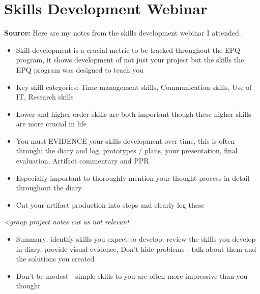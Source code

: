 \section{Skills Development Webinar}
\label{research:SkillsDevelopmentWebinar}

\textbf{Source:} 
Here are my notes from the skills development webinar I attended.
\begin{itemize}
	\item  Skill development is a crucial metric to be tracked throughout the EPQ program, it shows development of not just your project but the skills the EPQ program was designed to teach you
	\item  Key skill categories: Time management skills, Communication skills, Use of IT, Research skills
	\item  Lower and higher order skills are both important though these higher skills are more crucial in life
	\item  You must EVIDENCE your skills development over time, this is often through: the diary and log, prototypes / plans, your presentation, final evaluation, Artifact commentary and PPR
	\item  Especially important to thoroughly mention your thought process in detail throughout the diary
	\item  Cut your artifact production into steps and clearly log these
\end{itemize}


\begin{center}
\textit{<group project notes cut as not relevant}
\end{center}
	
\begin{itemize}
	\item Summary: identify skills you expect to develop, review the skills you develop in diary, provide visual evidence, Don’t hide problems - talk about them and the solutions you created
	\item Don't be modest - simple skills to you are often more impressive than you thought
\end{itemize}